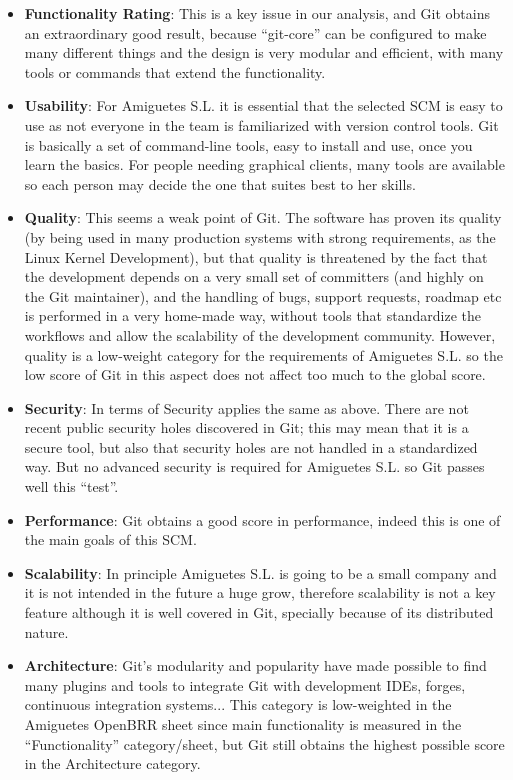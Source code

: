 \documentclass[a4paper,10pt]{article}
\begin{document}
\begin{itemize}
\item \textbf{Functionality Rating}: This is a key issue in our analysis, and
Git obtains an extraordinary good result, because ``git-core'' can be
configured to make many different things and the design is very modular
and efficient, with many tools or commands that extend the functionality.
\item \textbf{Usability}: For Amiguetes S.L. it is essential that the selected
SCM is easy to use as not everyone in the team is familiarized with version
control tools. Git is basically a set of command-line tools, easy to install
and use, once you learn the basics. For people needing graphical clients, many
tools are available so each person may decide the one that suites best to her
skills.
\item \textbf{Quality}: This seems a weak point of Git. The software has proven
its quality (by being used in many production systems with strong requirements,
as the Linux Kernel Development), but that quality is threatened by the fact
that the development depends on a very small set of committers (and highly on
the Git maintainer), and the handling of bugs, support requests, roadmap etc is
performed in a very home-made way, without tools that standardize the workflows
and allow the scalability of the development community. However, quality is a
low-weight category for the requirements of Amiguetes S.L. so the low score of
Git in this aspect does not affect too much to the global score.
 
\item \textbf{Security}: In terms of Security applies the same as above. There
are not recent public security holes discovered in Git; this may mean that it
is a secure tool, but also that security holes are not handled in a standardized
way. But no advanced security is required for Amiguetes S.L. so Git passes well
this ``test''.

\item \textbf{Performance}: Git obtains a good score in performance, indeed
this is one of the main goals of this SCM.
\item \textbf{Scalability}: In principle Amiguetes S.L. is going to be a small
company and it is not intended in the future a huge grow, therefore scalability
is not a key feature although it is well covered in Git, specially because of
its distributed nature.

\item \textbf{Architecture}: Git's modularity and popularity have made possible
to find many plugins and tools to integrate Git with development IDEs, forges,
continuous integration systems... This category is low-weighted in the
Amiguetes OpenBRR sheet since main functionality is measured in the
``Functionality'' category/sheet, but Git still obtains the highest possible
score in the Architecture category.


\end{itemize}
\end{document}

